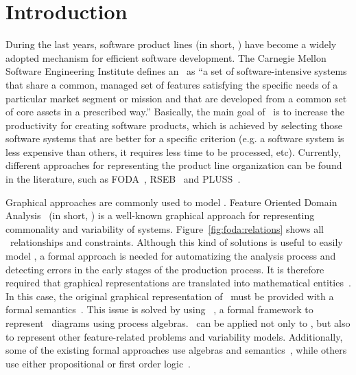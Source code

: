 \section{Introduction}
\label{ref:introduction}


During the last years, software product lines (in short, \SPLs) have become a widely adopted mechanism for efficient software development. The Carnegie Mellon Software Engineering Institute defines an \SPL\ as ``a set of software-intensive systems that share a common, managed set of features satisfying the specific needs of a particular market segment or mission and that are developed from a common set of core assets in a prescribed way.'' Basically, the main goal of \SPLs\ is to increase the productivity for creating software products, which is achieved by selecting those software systems that are better for a specific criterion (e.g. a software system is less expensive than others, it requires less time to be processed, etc). Currently, different approaches for representing the product line organization can be found in the literature, such as FODA~\cite{kchnp90},
RSEB~\cite{mj98} and PLUSS~\cite{k05,ebb06}.

Graphical approaches are commonly used to model \SPLs. Feature Oriented Domain Analysis~\cite{kchnp90} (in short, \FODA) is a well-known graphical approach for representing commonality and variability of systems. Figure~\ref{fig:foda:relations} shows all \FODA\ relationships and constraints.
Although this kind of solutions is useful to easily model \SPLs, a formal approach is needed for automatizing the analysis process and detecting errors in the early stages of the production process. It is therefore required that graphical representations are translated into mathematical entities~\cite{nak10}. In this case, the original graphical representation of \FODA\ must be provided with a formal semantics~\cite{bhst04}.
%
This  issue is solved by using \fodaPA~\cite{acl13}, a formal framework to represent \FODA\ diagrams using process algebras. \fodaPA\ can be applied not only to \FODA, but also to represent other feature-related problems and variability models. Additionally, some of the existing formal approaches use algebras and semantics~\cite{szw05,kkm06,prb11,acl13}, while others use either propositional or first order logic~\cite{man02,ka07,abgf10,atfg10,nnz14}.

